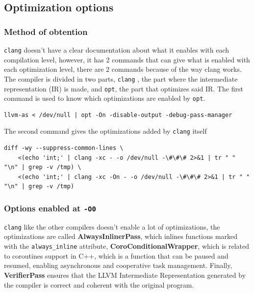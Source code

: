 \documentclass{rapport}
\newcommand{\clang}{\texttt{clang} }
\newcommand{\optizero}{\texttt{-O0} }
\begin{document}
\subsection{Optimization options}
\subsubsection{Method of obtention}
\clang doesn't have a clear documentation about what it enables with each compilation level, however, it has 2 commands that can give what is enabled with each 
optimization level, there are 2 commands because of the way clang works. \newline
The compiler is divided in two parts, \clang, the part where the intermediate representation (IR) is made, and \texttt{opt}, the part that optimizes said IR. 
The first command is used to know which optimizations are enabled by \texttt{opt}.
\begin{verbatim}
llvm-as < /dev/null | opt -On -disable-output -debug-pass-manager
\end{verbatim}
The second command gives the optimizations added by \clang itself
\begin{verbatim}
diff -wy --suppress-common-lines \
    <(echo 'int;' | clang -xc - -o /dev/null -\#\#\# 2>&1 | tr " " "\n" | grep -v /tmp) \
    <(echo 'int;' | clang -xc -On - -o /dev/null -\#\#\# 2>&1 | tr " " "\n" | grep -v /tmp)
\end{verbatim}
\subsubsection{Options enabled at \optizero}
\clang like the other compilers doesn't enable a lot of optimizations, the optimizations are called \textbf{AlwaysInlinerPass}, which inlines functions marked
with the \texttt{always\_inline} attribute, \textbf{CoroConditionalWrapper}, which is related to coroutines support in C++, which is a function that can be 
paused and resumed, enabling asynchronous and cooperative task management. Finally, \textbf{VerifierPass} ensures that the LLVM Intermediate Representation 
generated by the compiler is correct and coherent with the original program.
\end{document}
